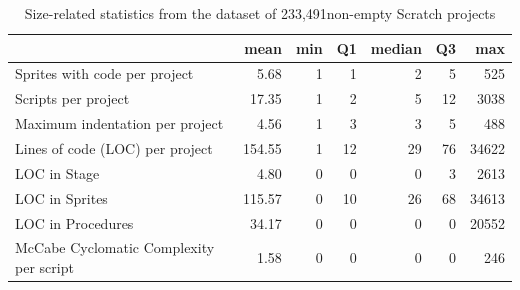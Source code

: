 \documentclass{sig-alternate}
\newcommand{\nScriptPrograms}{233,491}
\begin{document}
\begin{table}[ht]
	\centering
	\begin{tabular}{lrrrrrr}
		\hline
		&\textbf{mean}&\textbf{min}&\textbf{Q1}&\textbf{median}&\textbf{Q3}&\textbf{max}\\
		\hline
		Sprites with code per project&5.68&1&1&2&5&525\\
		Scripts per project&17.35&1&2&5&12&3038\\
		Maximum indentation per project&4.56&1&3&3&5&488\\
		Lines of code (LOC) per project&154.55&1&12&29&76&34622\\
		LOC in Stage&4.80&0&0&0&3&2613\\
		LOC in Sprites&115.57&0&10&26&68&34613\\
		LOC in Procedures&34.17&0&0&0&0&20552\\
		McCabe Cyclomatic Complexity per script&1.58&0&0&0&0&246\\
		\hline
	\end{tabular}
	\caption{Size-related statistics from the dataset of \nScriptPrograms  non-empty Scratch projects}
	\label{tbl-size}
\end{table}
\end{document}
